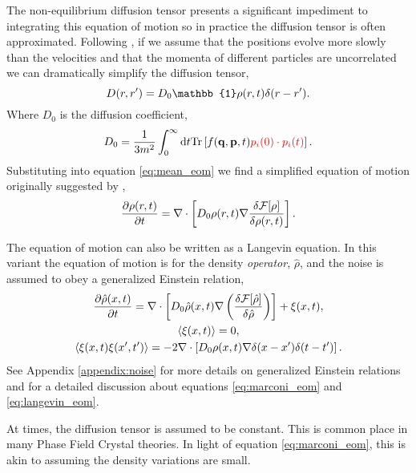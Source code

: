 The non-equilibrium diffusion tensor presents a significant impediment to
integrating this equation of motion so in practice the diffusion tensor is
often approximated. Following \cite{ESPANOL09}, if we assume that the positions
evolve more slowly than the velocities and that the momenta of different
particles are uncorrelated we can dramatically simplify the diffusion tensor,
%
\begin{equation}
    D(r, r^\prime) = D_0\mathbb{1}\rho(r, t)\d(r - r^\prime).
\end{equation}
%
Where $D_0$ is the diffusion coefficient,
%
\begin{equation}
    D_0 = \frac{1}{3 m^2} \int_0^\infty \mathrm{d}t 
        \mathrm{Tr}\left[ f(\mathbf{q}, \mathbf{p}, t) {\color{red} p_i(0) \cdot p_i(t)} \right].
\end{equation}
%
Substituting into equation \ref{eq:mean_eom} we find a simplified equation of
motion originally suggested by \cite{MT1999},
%
\begin{equation}
    \label{eq:marconi_eom}
    \frac{\partial \rho(r, t)}{\partial t} = 
        \nabla \cdot \left[ D_0 \rho(r, t)
        \nabla \frac{\delta \mathcal{F}[\rho]}{\delta \rho(r, t)}\right].
\end{equation}
%

The equation of motion can also be written as a Langevin equation. In this
variant the equation of motion is for the density \textit{operator},
$\hat{\rho}$, and the noise is assumed to obey a generalized Einstein relation,
%
\begin{gather}
    \label{eq:langevin_eom}
    \frac{\partial \hat{\rho}(x, t)}{\partial t} =
        \nabla \cdot \left[
            D_0 \hat{\rho}(x, t) \nabla \left(
            \frac{\delta \mathcal{F}[\hat{\rho}]}{\delta \hat{\rho}}\right)
            \right] + \xi(x, t), \\
    \left\langle \xi(x, t) \right\rangle = 0, \\
    \left\langle \xi(x, t)\xi(x^\prime, t^\prime) \right\rangle = 
        -2 \nabla \cdot \left[ D_0 \rho(x,t) 
            \nabla \delta(x - x^\prime) \delta(t - t^\prime)\right].
\end{gather}
%
See Appendix \ref{appendix:noise} for more details on generalized Einstein
relations and \cite{AR2004} for a detailed discussion about equations
\ref{eq:marconi_eom} and \ref{eq:langevin_eom}.

At times, the diffusion tensor is assumed to be constant. This is common place
in many Phase Field Crystal theories. In light of equation
\ref{eq:marconi_eom}, this is akin to assuming the density variations are
small.

